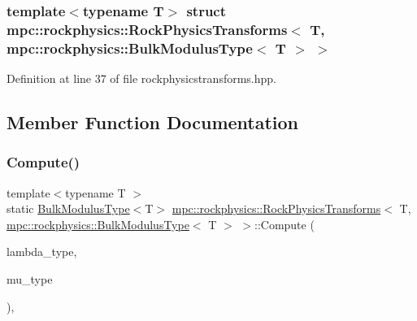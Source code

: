 \subsubsection*{template$<$typename T$>$\newline
struct mpc\+::rockphysics\+::\+Rock\+Physics\+Transforms$<$ T, mpc\+::rockphysics\+::\+Bulk\+Modulus\+Type$<$ T $>$ $>$}



Definition at line 37 of file rockphysicstransforms.\+hpp.



\subsection{Member Function Documentation}
\mbox{\label{structmpc_1_1rockphysics_1_1_rock_physics_transforms_3_01_t_00_01mpc_1_1rockphysics_1_1_bulk_modulus_type_3_01_t_01_4_01_4_addbfab4e83b3b5c535da97e0ca9f9fd3}} 
\subsubsection{\texorpdfstring{Compute()}{Compute()}\hspace{0.1cm}{\footnotesize\ttfamily [1/8]}}
{\footnotesize\ttfamily template$<$typename T $>$ \\
static \mbox{\hyperlink{structmpc_1_1rockphysics_1_1_bulk_modulus_type}{Bulk\+Modulus\+Type}}$<$T$>$ \mbox{\hyperlink{structmpc_1_1rockphysics_1_1_rock_physics_transforms}{mpc\+::rockphysics\+::\+Rock\+Physics\+Transforms}}$<$ T, \mbox{\hyperlink{structmpc_1_1rockphysics_1_1_bulk_modulus_type}{mpc\+::rockphysics\+::\+Bulk\+Modulus\+Type}}$<$ T $>$ $>$\+::Compute (\begin{DoxyParamCaption}\item[{const \mbox{\hyperlink{structmpc_1_1rockphysics_1_1_lame_paramter_modulus_type}{mpc\+::rockphysics\+::\+Lame\+Paramter\+Modulus\+Type}}$<$ T $>$ \&}]{lambda\+\_\+type,  }\item[{const \mbox{\hyperlink{structmpc_1_1rockphysics_1_1_shear_modulus_type}{mpc\+::rockphysics\+::\+Shear\+Modulus\+Type}}$<$ T $>$ \&}]{mu\+\_\+type }\end{DoxyParamCaption})\hspace{0.3cm}{\ttfamily [inline]}, {\ttfamily [static]}}



